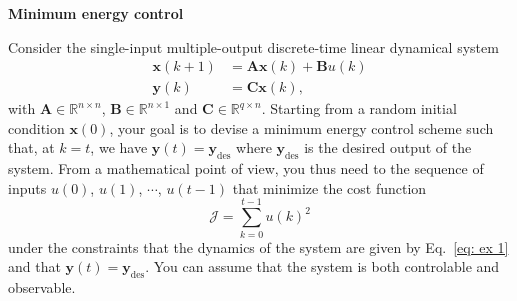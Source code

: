 \documentclass[12pt, answers]{exam}
\begin{document}
\begin{questions}


  \question \textbf{Minimum energy control}
  \noaddpoints

  Consider the single-input multiple-output discrete-time linear dynamical system
  \begin{equation}
    \begin{aligned}
      \bm{x}(k+1) & = \bm{Ax}(k) + \bm{B}u(k) \\
      \bm{y}(k) & = \bm{Cx}(k),
    \end{aligned}
    \label{eq: ex 1}
  \end{equation}
  with $\bm{A} \in \mathbb{R}^{n \times n}$, $\bm{B} \in \mathbb{R}^{n \times 1}$ and $\bm{C} \in \mathbb{R}^{q \times n}$.
  Starting from a random initial condition $\bm{x}(0)$, your goal is to devise a minimum energy control scheme such that, at $k = t$, we have $\bm{y}(t) = \bm{y}_{\text{des}}$ where $\bm{y}_{\text{des}}$ is the desired output of the system.
  From a mathematical point of view, you thus need to the sequence of inputs $u(0)$, $u(1)$, $\cdots$, $u(t-1)$ that minimize the cost function
  \[
  \mathcal{J} = \sum_{k=0}^{t-1} u(k)^2
  \]
  under the constraints that the dynamics of the system are given by Eq.~\eqref{eq: ex 1} and that $\bm{y}(t) = \bm{y}_{\text{des}}$.
  You can assume that the system is both controlable and observable.

\end{questions}
\end{document}

